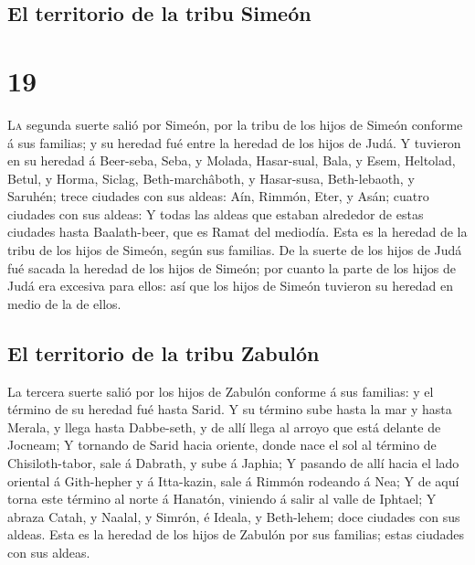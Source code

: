 \hypertarget{el-territorio-de-la-tribu-simeuxf3n}{%
\subsection{El territorio de la tribu
Simeón}\label{el-territorio-de-la-tribu-simeuxf3n}}

\hypertarget{section-06-19}{%
\section{19}\label{section-06-19}}

 \textsc{La} segunda suerte salió por Simeón, por la tribu
de los hijos de Simeón conforme á sus familias; y su heredad fué entre
la heredad de los hijos de Judá.  Y tuvieron en su heredad
á Beer-seba, Seba, y Molada,  Hasar-sual, Bala, y Esem,
 Heltolad, Betul, y Horma,  Siclag,
Beth-marchâboth, y Hasar-susa,  Beth-lebaoth, y Saruhén;
trece ciudades con sus aldeas:  Aín, Rimmón, Eter, y Asán;
cuatro ciudades con sus aldeas:  Y todas las aldeas que
estaban alrededor de estas ciudades hasta Baalath-beer, que es Ramat del
mediodía. Esta es la heredad de la tribu de los hijos de Simeón, según
sus familias.  De la suerte de los hijos de Judá fué
sacada la heredad de los hijos de Simeón; por cuanto la parte de los
hijos de Judá era excesiva para ellos: así que los hijos de Simeón
tuvieron su heredad en medio de la de ellos.

\hypertarget{el-territorio-de-la-tribu-zabuluxf3n}{%
\subsection{El territorio de la tribu
Zabulón}\label{el-territorio-de-la-tribu-zabuluxf3n}}

 La tercera suerte salió por los hijos de Zabulón
conforme á sus familias: y el término de su heredad fué hasta Sarid.
 Y su término sube hasta la mar y hasta Merala, y llega
hasta Dabbe-seth, y de allí llega al arroyo que está delante de Jocneam;
 Y tornando de Sarid hacia oriente, donde nace el sol al
término de Chisiloth-tabor, sale á Dabrath, y sube á Japhia;
 Y pasando de allí hacia el lado oriental á Gith-hepher y
á Itta-kazin, sale á Rimmón rodeando á Nea;  Y de aquí
torna este término al norte á Hanatón, viniendo á salir al valle de
Iphtael;  Y abraza Catah, y Naalal, y Simrón, é Ideala, y
Beth-lehem; doce ciudades con sus aldeas.  Esta es la
heredad de los hijos de Zabulón por sus familias; estas ciudades con sus
aldeas.

